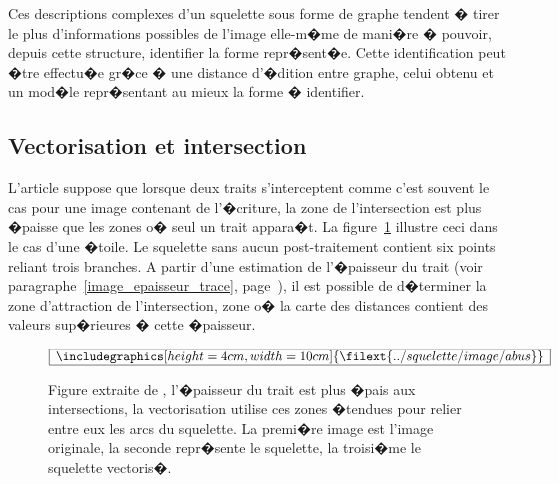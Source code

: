 Ces descriptions complexes d'un squelette sous forme de graphe tendent � tirer le plus d'informations possibles de l'image elle-m�me de mani�re � pouvoir, depuis cette structure, identifier la forme repr�sent�e. Cette identification peut �tre effectu�e gr�ce � une distance d'�dition entre graphe, celui obtenu et un mod�le repr�sentant au mieux la forme � identifier. 












\subsection{Vectorisation et intersection}
\label{squelette_vectorisation_Abuhaiba1996}

L'article  suppose que lorsque deux traits s'interceptent comme c'est souvent le cas pour une image contenant de l'�criture, la zone de l'intersection est plus �paisse que les zones o� seul un trait appara�t. La figure~\ref{squelette_vector_Abuhaiba1996} illustre ceci dans le cas d'une �toile. Le squelette sans aucun post-traitement contient six points reliant trois branches. A partir d'une estimation de l'�paisseur du trait (voir paragraphe~\ref{image_epaisseur_trace}, page~\pageref{image_epaisseur_trace}), il est possible de d�terminer la zone d'attraction de l'intersection, zone o� la carte des distances contient des valeurs sup�rieures � cette �paisseur.


            \begin{figure}[ht]
        $$\frame{$\begin{array}[c]{c}\includegraphics[height=4cm, width=10cm]
        {\filext{../squelette/image/abus}}\end{array}$}$$
        \caption{    Figure extraite de , l'�paisseur du trait est plus �pais aux intersections,
                            la vectorisation utilise ces zones �tendues pour relier entre eux les arcs du squelette. La premi�re
                            image est l'image originale, la seconde repr�sente le squelette, la troisi�me le squelette 
                            vectoris�.}
        \label{squelette_vector_Abuhaiba1996}
            \end{figure}

